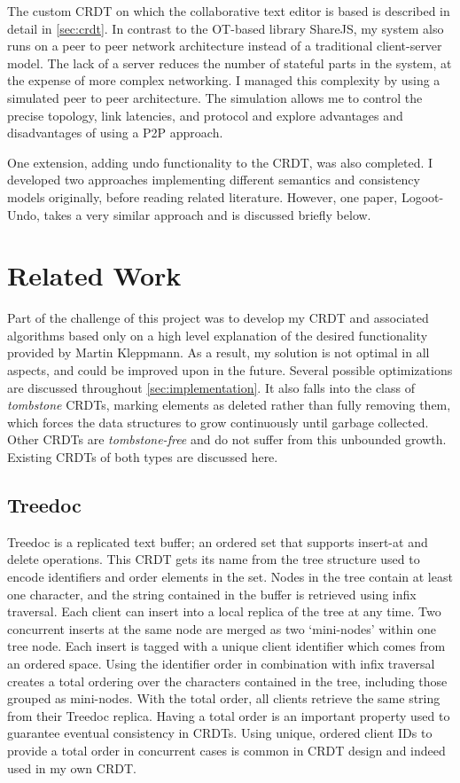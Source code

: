 \documentclass[12pt,a4paper,twoside,openright]{report}
\begin{document}
The custom CRDT on which the collaborative text editor is based is described in detail in \cref{sec:crdt}. In contrast to the OT-based library ShareJS, my system also runs on a peer to peer network architecture instead of a traditional client-server model. The lack of a server reduces the number of stateful parts in the system, at the expense of more complex networking. I managed this complexity by using a simulated peer to peer architecture. The simulation allows me to control the precise topology, link latencies, and protocol and explore advantages and disadvantages of using a P2P approach. 

One extension, adding undo functionality to the CRDT, was also completed. I developed two approaches implementing different semantics and consistency models originally, before reading related literature. However, one paper, Logoot-Undo, takes a very similar approach and is discussed briefly below.

\section{Related Work} \label{sec:relatedwork}

Part of the challenge of this project was to develop my CRDT and associated algorithms based only on a high level explanation of the desired functionality provided by Martin Kleppmann. As a result, my solution is not optimal in all aspects, and could be improved upon in the future. Several possible optimizations are discussed throughout \cref{sec:implementation}. It also falls into the class of \textit{tombstone} CRDTs, marking elements as deleted rather than fully removing them, which forces the data structures to grow continuously until garbage collected. Other CRDTs are \textit{tombstone-free} and do not suffer from this unbounded growth. Existing CRDTs of both types are discussed here.

\subsection{Treedoc}

Treedoc \cite{preguica2009} is a replicated text buffer; an ordered set that supports insert-at and delete operations. This CRDT gets its name from the tree structure used to encode identifiers and order elements in the set. Nodes in the tree contain at least one character, and the string contained in the buffer is retrieved using infix traversal. Each client can insert into a local replica of the tree at any time. Two concurrent inserts at the same node are merged as two `mini-nodes' within one tree node. Each insert is tagged with a unique client identifier which comes from an ordered space. Using the identifier order in combination with infix traversal creates a total ordering over the characters contained in the tree, including those grouped as mini-nodes. With the total order, all clients retrieve the same string from their Treedoc replica. Having a total order is an important property used to guarantee eventual consistency in CRDTs. Using unique, ordered client IDs to provide a total order in concurrent cases is common in CRDT design and indeed used in my own CRDT.
\end{document}
